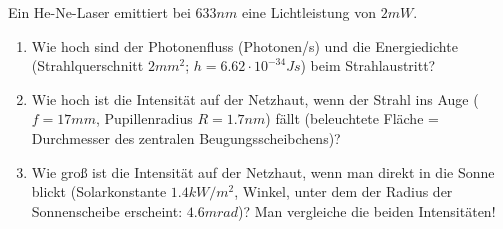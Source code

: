 \documentclass[12pt,a4paper,ngerman]{article}
\begin{document}
\begin{framed}
Ein He-Ne-Laser emittiert bei $633nm$ eine Lichtleistung von $2mW$.
\begin{enumerate}
\item Wie hoch sind der Photonenfluss (Photonen/s) und die Energiedichte (Strahlquerschnitt $2mm^2$; $h = 6.62 \cdot 10^{-34}Js$) beim Strahlaustritt? 
\item Wie hoch ist die Intensität auf der Netzhaut, wenn der Strahl ins Auge ($f=17mm$, Pupillenradius $R=1.7nm$) fällt (beleuchtete Fläche = Durchmesser des zentralen Beugungsscheibchens)?
\item Wie groß ist die Intensität auf der Netzhaut, wenn man direkt in die Sonne blickt (Solarkonstante $1.4kW/m^2$, Winkel, unter dem der Radius der Sonnenscheibe erscheint: $4.6mrad$)? Man vergleiche die beiden Intensitäten!
\end{enumerate}
\end{framed}
\end{document}
